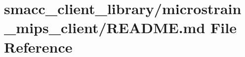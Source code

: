 \hypertarget{smacc__client__library_2microstrain__mips__client_2README_8md}{}\section{smacc\+\_\+client\+\_\+library/microstrain\+\_\+mips\+\_\+client/\+R\+E\+A\+D\+ME.md File Reference}
\label{smacc__client__library_2microstrain__mips__client_2README_8md}

